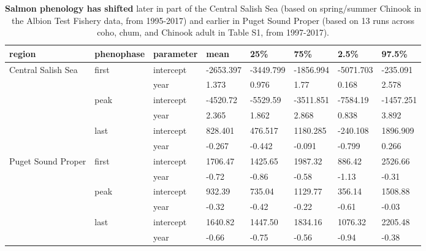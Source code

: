 \documentclass{article}
\begin{document}
\begin{table}[ht]
\centering
\caption{\textbf{Salmon phenology has shifted} later in part of the Central Salish Sea (based on spring/summer Chinook in the Albion Test Fishery data, from 1995-2017) and earlier in Puget Sound Proper (based on 13 runs across coho, chum, and Chinook adult in Table S1, from 1997-2017).} 
\label{tab:salmtren}
\begingroup\footnotesize
\begin{tabular}{|p{}|p{}p{}p{}p{}p{}p{}p{}|}
  \hline
region & phenophase & parameter & mean & 25\% & 75\% & 2.5\% & 97.5\% \\ 
  \hline
Central Salish Sea & first & intercept & -2653.397 & -3449.799 & -1856.994 & -5071.703 & -235.091 \\ 
   &  & year & 1.373 & 0.976 & 1.77 & 0.168 & 2.578 \\ 
   & peak & intercept & -4520.72 & -5529.59 & -3511.851 & -7584.19 & -1457.251 \\ 
   &  & year & 2.365 & 1.862 & 2.868 & 0.838 & 3.892 \\ 
   & last & intercept & 828.401 & 476.517 & 1180.285 & -240.108 & 1896.909 \\ 
   &  & year & -0.267 & -0.442 & -0.091 & -0.799 & 0.266 \\ 
   \hline
Puget Sound Proper & first & intercept & 1706.47 & 1425.65 & 1987.32 &  886.42 & 2526.66 \\ 
   &  & year & -0.72 & -0.86 & -0.58 & -1.13 & -0.31 \\ 
   & peak & intercept &  932.39 &  735.04 & 1129.77 &  356.14 & 1508.88 \\ 
   &  & year & -0.32 & -0.42 & -0.22 & -0.61 & -0.03 \\ 
   & last & intercept & 1640.82 & 1447.50 & 1834.16 & 1076.32 & 2205.48 \\ 
   &  & year & -0.66 & -0.75 & -0.56 & -0.94 & -0.38 \\ 
   \hline
\end{tabular}
\endgroup
\end{table}
\end{document}
